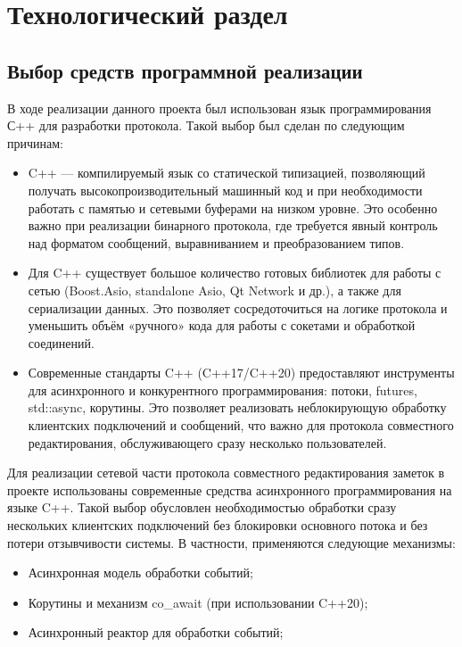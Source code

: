 \chapter{Технологический раздел}

\section{Выбор средств программной реализации}

В ходе реализации данного проекта был использован язык программирования С++ для разработки протокола. 
Такой выбор был сделан по следующим причинам:

\begin{itemize}
    \item C++ — компилируемый язык со статической типизацией, позволяющий получать высокопроизводительный машинный код и при необходимости работать с памятью и сетевыми буферами на низком уровне. 
    Это особенно важно при реализации бинарного протокола, где требуется явный контроль над форматом сообщений, выравниванием и преобразованием типов.
    \item Для C++ существует большое количество готовых библиотек для работы с сетью (Boost.Asio, standalone Asio, Qt Network и др.), а также для сериализации данных. 
    Это позволяет сосредоточиться на логике протокола и уменьшить объём «ручного» кода для работы с сокетами и обработкой соединений.
    \item Современные стандарты C++ (C++17/C++20) предоставляют инструменты для асинхронного и конкурентного программирования: потоки, futures, std::async, корутины. 
    Это позволяет реализовать неблокирующую обработку клиентских подключений и сообщений, что важно для протокола совместного редактирования, обслуживающего сразу несколько пользователей.
\end{itemize}


Для реализации сетевой части протокола совместного редактирования заметок в проекте использованы современные средства асинхронного программирования на языке C++. 
Такой выбор обусловлен необходимостью обработки сразу нескольких клиентских подключений без блокировки основного потока и без потери отзывчивости системы. 
В частности, применяются следующие механизмы:

\begin{itemize}
    \item Асинхронная модель обработки событий;
    \item Корутины и механизм co\_await (при использовании C++20);
    \item Асинхронный реактор для обработки событий;
\end{itemize}

